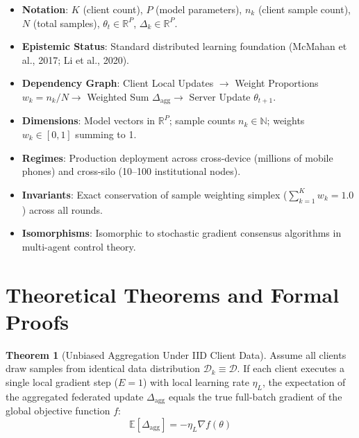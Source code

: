 \documentclass[11pt,a4paper]{article}
\theoremstyle{definition}
\newtheorem{theorem}{\textbf{Theorem}}[section]
\begin{document}
\begin{itemize}
    \item \textbf{Notation}: $K$ (client count), $P$ (model parameters), $n_k$ (client sample count), $N$ (total samples), $\theta_t \in \mathbb{R}^P$, $\Delta_k \in \mathbb{R}^P$.
    \item \textbf{Epistemic Status}: Standard distributed learning foundation (McMahan et al., 2017; Li et al., 2020).
    \item \textbf{Dependency Graph}: Client Local Updates $\to$ Weight Proportions $w_k = n_k/N \to$ Weighted Sum $\Delta_{\text{agg}} \to$ Server Update $\theta_{t+1}$.
    \item \textbf{Dimensions}: Model vectors in $\mathbb{R}^P$; sample counts $n_k \in \mathbb{N}$; weights $w_k \in [0, 1]$ summing to 1.
    \item \textbf{Regimes}: Production deployment across cross-device (millions of mobile phones) and cross-silo (10--100 institutional nodes).
    \item \textbf{Invariants}: Exact conservation of sample weighting simplex ($\sum_{k=1}^K w_k = 1.0$) across all rounds.
    \item \textbf{Isomorphisms}: Isomorphic to stochastic gradient consensus algorithms in multi-agent control theory.
\end{itemize}

\section{Theoretical Theorems and Formal Proofs}

\begin{theorem}[Unbiased Aggregation Under IID Client Data]
Assume all clients draw samples from identical data distribution $\mathcal{D}_k \equiv \mathcal{D}$. If each client executes a single local gradient step ($E=1$) with local learning rate $\eta_L$, the expectation of the aggregated federated update $\Delta_{\text{agg}}$ equals the true full-batch gradient of the global objective function $f$:
{\boldmath
\begin{equation}
\mathbb{E}\left[ \Delta_{\text{agg}} \right] = -\eta_L \nabla f(\theta)
\end{equation}
}
\end{theorem}
\end{document}
